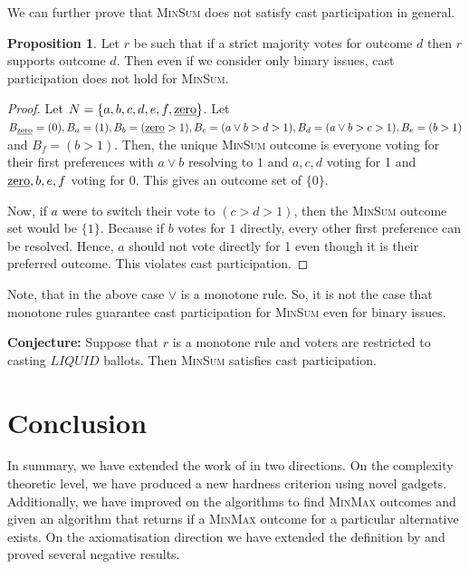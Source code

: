 \documentclass[11pt,a4paper, titlepage]{article}
\theoremstyle{definition}
\newtheorem{proposition}[theorem]{Proposition}
\newcommand{\LIQUID}{\mathit{LIQUID}}
\begin{document}
We can further prove that \textsc{MinSum} does not satisfy cast participation in general.

\begin{proposition} \label{prop:cast-sum}
    Let $r$ be such that if a strict majority votes for outcome $d$ then $r$ supports outcome $d$. Then even if we consider only binary issues, cast participation does not hold for \textsc{MinSum}. 
\end{proposition}

\begin{proof}
    Let $N = \{a, b, c, d, e, f, \text{\underline{zero}}\}$. Let $B_\text{\underline{zero}} = (0), B_a = (1), B_b = (\text{\underline{zero}} > 1), B_c = (a \lor b > d > 1), B_d = (a \lor b > c > 1), B_e = (b > 1)$ and $B_f = (b > 1)$. Then, the unique \textsc{MinSum} outcome is everyone voting for their first preferences with $a \lor b$ resolving to $1$ and $a, c, d$ voting for 1 and $\text{\underline{zero}}, b, e, f$ voting for 0. This gives an outcome set of $\{0\}$.

    Now, if $a$ were to switch their vote to $(c > d > 1)$, then the \textsc{MinSum} outcome set would be $\{1\}$. Because if $b$ votes for $1$ directly, every other first preference can be resolved.
    Hence, $a$ should not vote directly for 1 even though it is their preferred outcome. This violates cast participation.
\end{proof}

Note, that in the above case $\lor$ is a monotone rule. So, it is not the case that monotone rules guarantee cast participation for \textsc{MinSum} even for binary issues.

\textbf{Conjecture:}
    Suppose that $r$ is a monotone rule and voters are restricted to casting $\LIQUID$ ballots. Then \textsc{MinSum} satisfies cast participation.

\newpage
\section{Conclusion}

In summary, we have extended the work of \citet{grandi} in two directions. On the complexity theoretic level, we have produced a new hardness criterion using novel gadgets. Additionally, we have improved on the algorithms to find \textsc{MinMax} outcomes and given an algorithm that returns if a \textsc{MinMax} outcome for a particular alternative exists.
On the axiomatisation direction we have extended the definition by \citeauthor{grandi} and proved several negative results.
\end{document}
